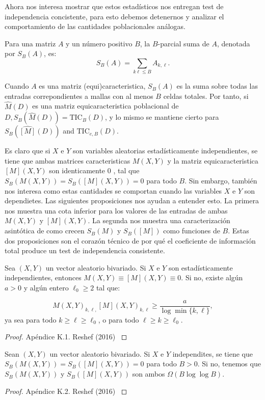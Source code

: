 	Ahora nos interesa mostrar que estos estad\'isticos nos entregan test de independencia concistente, para esto debemos detenernos y analizar el comportamiento de las cantidades poblacionales an\'alogas. 

	\begin{defn}
		Para una matriz $A$	y un n\'umero positivo $B$, la $B$-parcial suma de 	$A$, denotada por  $S_B(A)$, es:
		$$
		S_B(A)=\sum_{k \ell \leq B} A_{k, \ell}.
		$$
		
		Cuando $A$ es una matriz (equi)caracteristica, $S_B(A)$ es la suma sobre todas las entradas correpondientes a mallas con al menos $B$ celdas totales. Por tanto, si $\widehat{M}(D)$ es una matriz equicaracteristica poblacional de $D, S_B(\widehat{M}(D))=\mathrm{TIC}_B(D)$, y lo mismo se mantiene cierto para $S_B(\widehat{[M]}(D))$ and $\mathrm{TIC}_{e, B}(D)$.
		
		Es claro que si $X$ e $Y$ son variables aleatorias estad\'isticamente independientes, se tiene que ambas matrices caracteristicas $M(X, Y)$ y la matriz equicaracteristica $[M](X, Y)$ son identicamente 0 , tal que $S_B(M(X, Y))=S_B([M](X, Y))=0$ para todo $B$. Sin embargo, tambi\'en nos interesa como estas cantidades se comportan cuando las variables $X$ e $Y$ son dependietes. Las siguientes proposiciones nos ayudan a entender esto. La primera nos muestra una cota inferior para los valores de las entradas de ambas $M(X, Y)$ y $[M](X, Y)$. La segunda nos muestra una caracterizaci\'on asint\'otica de como crecen $S_B(M)$ y $S_B([M])$ como funciones de $B$. Estas dos proposiciones son el coraz\'on t\'ecnico de por qu\'e el coeficiente de informaci\'on total produce un test de independencia consistente.
		
		\begin{prop}
			Sea $(X, Y)$ un vector aleatorio bivariado. Si $X$ e $Y$ son estad\'isticamente independientes, entonces $M(X, Y) \equiv[M](X, Y) \equiv 0$. Si no, existe alg\'un $a>0$ y alg\'un entero $\ell_0 \geq 2$ tal que:
			
			$$
			M(X, Y)_{k, \ell,}[M](X, Y)_{k, \ell} \geq \frac{a}{\log \min \{k, \ell\}},
			$$
			ya sea para todo $k \geq \ell \geq \ell_0$, o para todo $\ell \geq k \geq \ell_0$.
		\end{prop}
		\begin{proof}
			Ap\'endice K.1. Reshef (2016) \cite{Reshef2016}
		\end{proof}
		\begin{prop}
			Sean $(X, Y)$ un vector aleatorio bivariado. Si $X$ e $Y$ independites, se tiene que  $S_B(M(X, Y))=S_B([M](X, Y))=0$ para todo $B>0$. Si no, tenemos que $S_B(M(X, Y))$ y $S_B([M](X, Y))$ son ambos $\Omega(B \log \log B)$.
		\end{prop}
		\begin{proof}
			Ap\'endice K.2. Reshef (2016) \cite{Reshef2016}
		\end{proof}


\end{defn}
